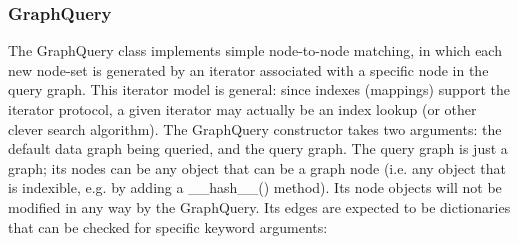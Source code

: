 \documentclass{howto}
\begin{document}
\subsubsection{GraphQuery}

The GraphQuery class implements simple node-to-node matching, in which each new node-set is generated by an iterator associated with a specific node in the query graph.  This iterator model is general: since indexes (mappings) support the iterator protocol, a given iterator may actually be an index lookup (or other clever search algorithm).  The GraphQuery constructor takes two arguments: the default data graph being queried, and the query graph.  The query graph is just a graph; its nodes can be any object that can be a graph node (i.e. any object that is indexible, e.g. by adding a __hash__() method).  Its node objects will not be modified in any way by the GraphQuery.  Its edges are expected to be dictionaries that can be checked for specific keyword arguments:
\end{document}
